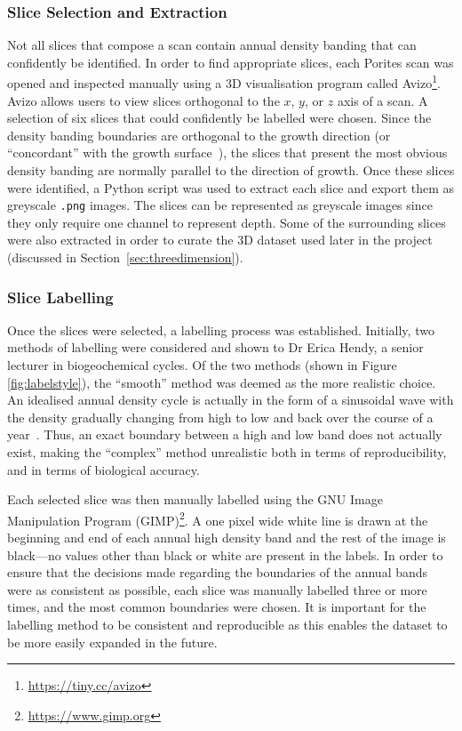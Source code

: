 \subsubsection{Slice Selection and Extraction}

Not all slices that compose a scan contain annual density banding that can confidently be identified. In order to find appropriate slices, each Porites scan was opened and inspected manually using a 3D visualisation program called Avizo\footnote{\url{https://tiny.cc/avizo}}. Avizo allows users to view slices orthogonal to the $x$, $y$, or $z$ axis of a scan. A selection of six slices that could confidently be labelled were chosen. Since the density banding boundaries are orthogonal to the growth direction (or ``concordant'' with the growth surface~\cite{knutson}), the slices that present the most obvious density banding are normally parallel to the direction of growth. Once these slices were identified, a Python script was used to extract each slice and export them as greyscale \texttt{.png} images. The slices can be represented as greyscale images since they only require one channel to represent depth. Some of the surrounding slices were also extracted in order to curate the 3D dataset used later in the project (discussed in Section~\ref{sec:threedimension}).

\subsubsection{Slice Labelling}

Once the slices were selected, a labelling process was established. Initially, two methods of labelling were considered and shown to Dr Erica Hendy, a senior lecturer in biogeochemical cycles. Of the two methods (shown in Figure \ref{fig:labelstyle}), the ``smooth'' method was deemed as the more realistic choice. An idealised annual density cycle is actually in the form of a sinusoidal wave with the density gradually changing from high to low and back over the course of a year~\cite[p. 39]{coralsine}. Thus, an exact boundary between a high and low band does not actually exist, making the ``complex'' method unrealistic both in terms of reproducibility, and in terms of biological accuracy.

Each selected slice was then manually labelled using the GNU Image Manipulation Program (GIMP)\footnote{\url{https://www.gimp.org}}. A one pixel wide white line is drawn at the beginning and end of each annual high density band and the rest of the image is black---no values other than black or white are present in the labels. In order to ensure that the decisions made regarding the boundaries of the annual bands were as consistent as possible, each slice was manually labelled three or more times, and the most common boundaries were chosen. It is important for the labelling method to be consistent and reproducible as this enables the dataset to be more easily expanded in the future.

